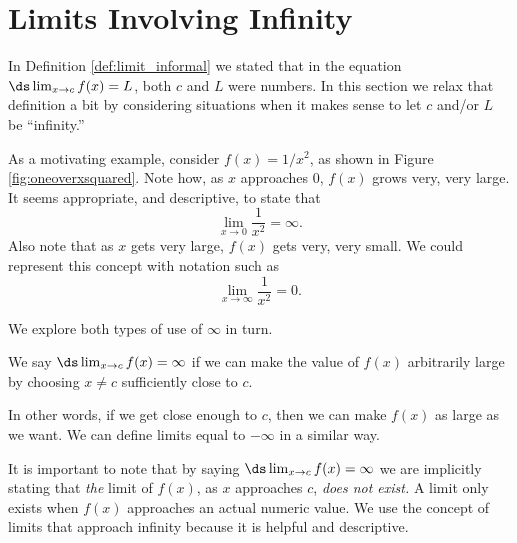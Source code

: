 \section{Limits Involving Infinity}\label{sec:limits_infty}

In Definition \ref{def:limit_informal} we stated that in the equation $\ds \lim_{x\to c}f(x) = L$, both $c$ and $L$ were numbers. In this section we relax that definition a bit by considering situations when it makes sense to let $c$ and/or $L$ be ``infinity.''

As a motivating example, consider $f(x) = 1/x^2$, as shown in Figure \ref{fig:oneoverxsquared}. Note how, as $x$ approaches 0, $f(x)$ grows very, very large. It seems appropriate, and descriptive, to state that 
\[
\lim_{x\rightarrow 0} \frac1{x^2}=\infty.
\]
Also note that as $x$ gets very large, $f(x)$ gets very, very small. We could represent this concept with notation such as 
\[
\lim_{x\rightarrow \infty} \frac1{x^2}=0.
\]


We explore both types of use of $\infty$ in turn.

{We say $\ds \lim_{x\rightarrow c} f(x)=\infty$ if we can make the value of $f(x)$ arbitrarily large by choosing $x\neq c$ sufficiently close to $c$.   
}


In other words, if we get close enough to $c$, then we can make $f(x)$ as large as we want.  We can define limits equal to $-\infty$ in a similar way.

It is important to note that by saying $\ds \lim_{x\to c}f(x) = \infty$ we are implicitly stating that \textit{the} limit of $f(x)$, as $x$ approaches $c$, \textit{does not exist.} A limit only exists when $f(x)$ approaches an actual numeric value. We use the concept of limits that approach infinity because it is helpful and descriptive.\\

